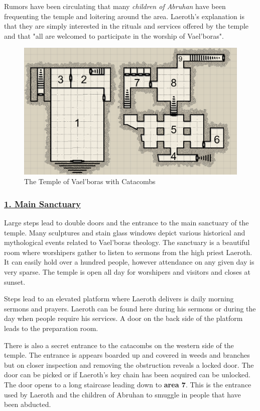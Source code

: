 \begin{multicols*}{2}
Rumors have been circulating that many \emph{children of Abruhan} have been frequenting the temple and loitering around the area. Laeroth's explanation is that they are simply interested in the rituals and services offered by the temple and that "all are welcomed to participate in the worship of Vael'boras". 

\begin{figure}
	\centering
	\includegraphics[width=\textwidth]{images/vaelboras_temple}
	\caption{The Temple of Vael'boras with Catacombs}
\end{figure}

\subsubsection*{\underline{1. Main Sanctuary}}
Large steps lead to double doors and the entrance to the main sanctuary of the temple. Many sculptures and stain glass windows depict various historical and mythological events related to Vael'boras theology. The sanctuary is a beautiful room where worshipers gather to listen to sermons from the high priest Laeroth. It can easily hold over a hundred people, however attendance on any given day is very sparse. The temple is open all day for worshipers and visitors and closes at sunset. 

 Steps lead to an elevated platform where Laeroth delivers is daily morning sermons and prayers. Laeroth can be found here during his sermons or during the day when people require his services. A door on the back side of the platform leads to the preparation room.
 
 There is also a secret entrance to the catacombs on the western side of the temple. The entrance is appears boarded up and covered in weeds and branches but on closer inspection and removing the obstruction reveals a locked door. The door can be picked or if Laeroth's key chain has been acquired can be unlocked. The door opens to a long staircase leading down to \textbf{area 7}. This is the entrance used by Laeroth and the children of Abruhan to smuggle in people that have been abducted.


\end{multicols*}
